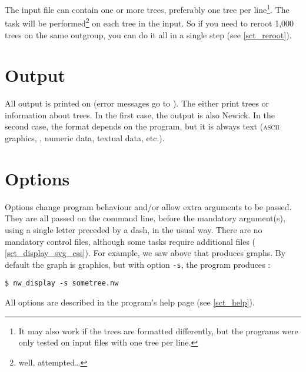 The input file can contain one or more trees, preferably one tree per
line\footnote{It may also work if the trees are formatted differently, but the
programs were only tested on input files with one tree per line.}. The task
will be performed\footnote{well, attempted\ldots} on each tree in the input. So if you need to reroot 1,000
trees on the same outgroup, you can do it all in a single step (see
\ref{sct_reroot}). 

\section{Output}
\label{sct_output}

All output is printed on \stdout{} (error messages go to \stderr). The \nutils{}
either print trees or information about trees. In the first case, the output is
also Newick. In the second case, the format depends on the program, but it is
always text (\textsc{ascii} graphics, \svg, numeric data, textual data, etc.).

\section{Options}
\label{sct_options}

Options change program behaviour and/or allow extra arguments to be passed.
They are all passed on the command line, before the mandatory argument(s),
using a single letter preceded by a dash, in the usual \unix{} way. There are
no mandatory control files, although some tasks require additional files (\eg{}
\ref{sct_display_svg_css}). For example, we saw above that \display{} produces
graphs. By default the graph is \ascii{} graphics, but with option \texttt{-s},
the program produces \svg:
\begin{verbatim}
$ nw_display -s sometree.nw
\end{verbatim}
All options are described in the program's help page (see \ref{sct_help}).
